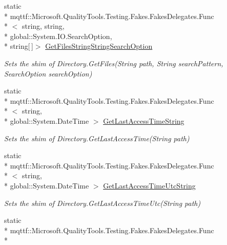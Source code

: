 \begin{DoxyCompactItemize}
static \\*
mqttf\-::\-Microsoft.\-Quality\-Tools.\-Testing.\-Fakes.\-Fakes\-Delegates.\-Func\\*
$<$ string, string, \\*
global\-::\-System.\-I\-O.\-Search\-Option, \\*
string\mbox{[}$\,$\mbox{]}$>$ \hyperlink{class_system_1_1_i_o_1_1_fakes_1_1_shim_directory_aa5a17fff0389e4605513a0a24c41eccc}{Get\-Files\-String\-String\-Search\-Option}
\begin{DoxyCompactList}\small\item\em Sets the shim of Directory.\-Get\-Files(\-String path, String search\-Pattern, Search\-Option search\-Option)\end{DoxyCompactList}\item 
static \\*
mqttf\-::\-Microsoft.\-Quality\-Tools.\-Testing.\-Fakes.\-Fakes\-Delegates.\-Func\\*
$<$ string, \\*
global\-::\-System.\-Date\-Time $>$ \hyperlink{class_system_1_1_i_o_1_1_fakes_1_1_shim_directory_a5e720455e9f65b93c403fc2871a1dc78}{Get\-Last\-Access\-Time\-String}
\begin{DoxyCompactList}\small\item\em Sets the shim of Directory.\-Get\-Last\-Access\-Time(\-String path)\end{DoxyCompactList}\item 
static \\*
mqttf\-::\-Microsoft.\-Quality\-Tools.\-Testing.\-Fakes.\-Fakes\-Delegates.\-Func\\*
$<$ string, \\*
global\-::\-System.\-Date\-Time $>$ \hyperlink{class_system_1_1_i_o_1_1_fakes_1_1_shim_directory_a3b23f718c9a672da59d5cceb7ac35e11}{Get\-Last\-Access\-Time\-Utc\-String}
\begin{DoxyCompactList}\small\item\em Sets the shim of Directory.\-Get\-Last\-Access\-Time\-Utc(\-String path)\end{DoxyCompactList}\item 
static \\*
mqttf\-::\-Microsoft.\-Quality\-Tools.\-Testing.\-Fakes.\-Fakes\-Delegates.\-Func\\*

\end{DoxyCompactItemize}
